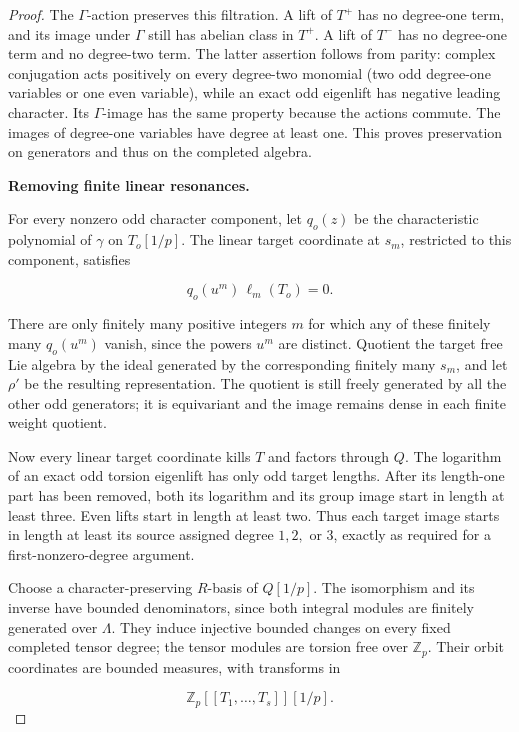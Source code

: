 \documentclass[11pt,a4paper]{article}
\theoremstyle{definition}
\begin{document}
\begin{proof}
The \(\Gamma\)-action preserves this filtration. A lift of \(T^+\) has no degree-one term, and its image under \(\Gamma\) still has abelian class in \(T^+\). A lift of \(T^-\) has no degree-one term and no degree-two term. The latter assertion follows from parity: complex conjugation acts positively on every degree-two monomial (two odd degree-one variables or one even variable), while an exact odd eigenlift has negative leading character. Its \(\Gamma\)-image has the same property because the actions commute. The images of degree-one variables have degree at least one. This proves preservation on generators and thus on the completed algebra.

\par\medskip\noindent\textbf{Removing finite linear resonances.}

For every nonzero odd character component, let \(q_o(z)\) be the characteristic polynomial of \(\gamma\) on \(T_o[1/p]\). The linear target coordinate at \(s_m\), restricted to this component, satisfies

\[
q_o(u^m)\,\ell_m(T_o)=0.
\]

There are only finitely many positive integers \(m\) for which any of these finitely many \(q_o(u^m)\) vanish, since the powers \(u^m\) are distinct. Quotient the target free Lie algebra by the ideal generated by the corresponding finitely many \(s_m\), and let \(\rho'\) be the resulting representation. The quotient is still freely generated by all the other odd generators; it is equivariant and the image remains dense in each finite weight quotient.

Now every linear target coordinate kills \(T\) and factors through \(Q\). The logarithm of an exact odd torsion eigenlift has only odd target lengths. After its length-one part has been removed, both its logarithm and its group image start in length at least three. Even lifts start in length at least two. Thus each target image starts in length at least its source assigned degree \(1,2,\) or \(3\), exactly as required for a first-nonzero-degree argument.

Choose a character-preserving \(R\)-basis of \(Q[1/p]\). The isomorphism and its inverse have bounded denominators, since both integral modules are finitely generated over \(\Lambda\). They induce injective bounded changes on every fixed completed tensor degree; the tensor modules are torsion free over \(\mathbb Z_p\). Their orbit coordinates are bounded measures, with transforms in

\[
\mathbb Z_p[[T_1,\ldots,T_s]][1/p].
\]


\end{proof}
\end{document}
